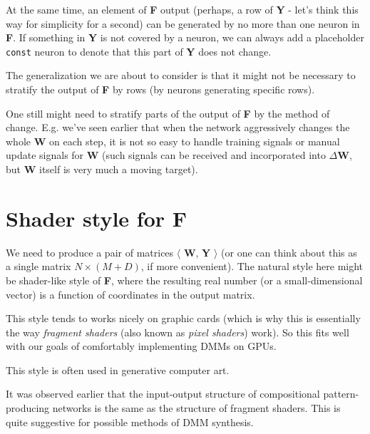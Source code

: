\documentclass{article}
\begin{document}
\smallskip

At the same time, an element of {\bf F} output (perhaps, a row of {\bf Y} - let's think this way for simplicity for a second) can
be generated by no more than one neuron in {\bf F}. If something in {\bf Y} is not covered by a neuron, we can always add a placeholder {\tt const} neuron to denote that this part of {\bf Y} does not change.

\bigskip

The generalization we are about to consider is that it might not be necessary to stratify the output of {\bf F} by rows (by neurons generating specific rows). 

\smallskip

One still might need to stratify parts of the output of {\bf F} by the method of change. E.g. we've seen earlier that when the network aggressively changes the whole {\bf W} on each step, it is not so easy to handle training signals or manual update signals for {\bf W} (such signals can be received and incorporated into $\Delta${\bf W}, but {\bf W} itself is very much a moving target). 

\section{Shader style for {\bf F}}

We need to produce a pair of matrices $\langle\!\!$ {\bf W}, {\bf Y} $\!\!\rangle$ (or one can think about this as a single matrix $N\times (M+D)$, if more convenient). The natural style here might be shader-like style of {\bf F}, where the resulting real number (or a small-dimensional vector) is a function of coordinates in the output matrix.

\smallskip

This style tends to works nicely on graphic cards (which is why this is essentially the way {\em fragment shaders} (also known as {\em pixel shaders}) work). So this fits well with our goals of comfortably implementing DMMs on GPUs.

\smallskip

This style is often used in generative computer art.

\bigskip

It was observed earlier that the input-output structure of compositional pattern-producing networks is the same as the structure of fragment shaders. This is quite suggestive for possible methods of DMM synthesis.
\end{document}
